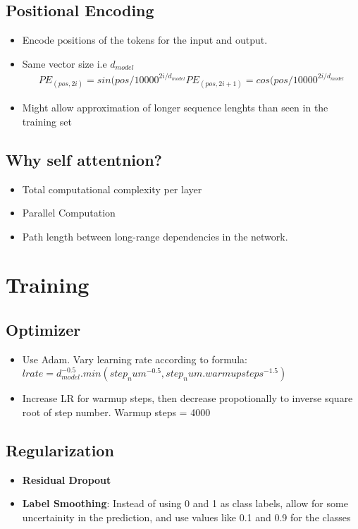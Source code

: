 \documentclass[a4paper]{article}
\begin{document}
\subsection{Positional Encoding}
\begin{itemize}
    \item Encode positions of the tokens for the input and output.
    \item Same vector size i.e $d_{model}$
    \begin{equation}
    \begin{split}
        PE_{(pos, 2i)} = sin(pos/10000^{2i/d_{model}}
        PE_{(pos, 2i+1)} = cos(pos/10000^{2i/d_{model}}
    \end{split}
    \end{equation}
    \item Might allow approximation of longer sequence lenghts than seen in the training set
\end{itemize}
\subsection{Why self attentnion?}
\begin{itemize}
    \item Total computational complexity per layer
    \item Parallel Computation
    \item Path length between long-range dependencies in the network.
\end{itemize}
\section{Training}
\subsection{Optimizer}
\begin{itemize}
    \item Use Adam. Vary learning rate according to formula: $lrate = d_{model}^{-0.5} . min(step_num^{-0.5}, step_num . warmupsteps^{-1.5})$
    \item Increase LR for warmup steps, then decrease propotionally to inverse square root of step number. Warmup steps = 4000
\end{itemize}
\subsection{Regularization}
\begin{itemize}
    \item \textbf{Residual Dropout} 
    \item \textbf{Label Smoothing}: Instead of using 0 and 1 as class labels, allow for some uncertainity in the prediction, and use values like 0.1 and 0.9 for the classes 
\end{itemize}
\end{document}
